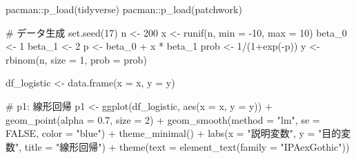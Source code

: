 \documentclass[
  a4paper,
]{ltjsbook}
\newenvironment{Shaded}{\begin{snugshade}}{\end{snugshade}}
\newcommand{\AttributeTok}[1]{\textcolor[rgb]{0.40,0.45,0.13}{#1}}
\newcommand{\CommentTok}[1]{\textcolor[rgb]{0.37,0.37,0.37}{#1}}
\newcommand{\ConstantTok}[1]{\textcolor[rgb]{0.56,0.35,0.01}{#1}}
\newcommand{\DecValTok}[1]{\textcolor[rgb]{0.68,0.00,0.00}{#1}}
\newcommand{\FloatTok}[1]{\textcolor[rgb]{0.68,0.00,0.00}{#1}}
\newcommand{\FunctionTok}[1]{\textcolor[rgb]{0.28,0.35,0.67}{#1}}
\newcommand{\NormalTok}[1]{\textcolor[rgb]{0.00,0.23,0.31}{#1}}
\newcommand{\OtherTok}[1]{\textcolor[rgb]{0.00,0.23,0.31}{#1}}
\newcommand{\SpecialCharTok}[1]{\textcolor[rgb]{0.37,0.37,0.37}{#1}}
\newcommand{\StringTok}[1]{\textcolor[rgb]{0.13,0.47,0.30}{#1}}
\begin{document}
\begin{Shaded}
\begin{Highlighting}[]
\NormalTok{pacman}\SpecialCharTok{::}\FunctionTok{p\_load}\NormalTok{(tidyverse)}
\NormalTok{pacman}\SpecialCharTok{::}\FunctionTok{p\_load}\NormalTok{(patchwork)}

\CommentTok{\# データ生成}
\FunctionTok{set.seed}\NormalTok{(}\DecValTok{17}\NormalTok{)}
\NormalTok{n }\OtherTok{\textless{}{-}} \DecValTok{200}
\NormalTok{x }\OtherTok{\textless{}{-}} \FunctionTok{runif}\NormalTok{(n, }\AttributeTok{min =} \SpecialCharTok{{-}}\DecValTok{10}\NormalTok{, }\AttributeTok{max =} \DecValTok{10}\NormalTok{)}
\NormalTok{beta\_0 }\OtherTok{\textless{}{-}} \DecValTok{1}
\NormalTok{beta\_1 }\OtherTok{\textless{}{-}} \DecValTok{2}
\NormalTok{p }\OtherTok{\textless{}{-}}\NormalTok{ beta\_0 }\SpecialCharTok{+}\NormalTok{ x }\SpecialCharTok{*}\NormalTok{ beta\_1}
\NormalTok{prob }\OtherTok{\textless{}{-}} \DecValTok{1}\SpecialCharTok{/}\NormalTok{(}\DecValTok{1}\SpecialCharTok{+}\FunctionTok{exp}\NormalTok{(}\SpecialCharTok{{-}}\NormalTok{p))}
\NormalTok{y }\OtherTok{\textless{}{-}} \FunctionTok{rbinom}\NormalTok{(n, }\AttributeTok{size =} \DecValTok{1}\NormalTok{, }\AttributeTok{prob =}\NormalTok{ prob)}

\NormalTok{df\_logistic }\OtherTok{\textless{}{-}} \FunctionTok{data.frame}\NormalTok{(}\AttributeTok{x =}\NormalTok{ x, }\AttributeTok{y =}\NormalTok{ y)}

\CommentTok{\# p1: 線形回帰}
\NormalTok{p1 }\OtherTok{\textless{}{-}} \FunctionTok{ggplot}\NormalTok{(df\_logistic, }\FunctionTok{aes}\NormalTok{(}\AttributeTok{x =}\NormalTok{ x, }\AttributeTok{y =}\NormalTok{ y)) }\SpecialCharTok{+}
    \FunctionTok{geom\_point}\NormalTok{(}\AttributeTok{alpha =} \FloatTok{0.7}\NormalTok{, }\AttributeTok{size =} \DecValTok{2}\NormalTok{) }\SpecialCharTok{+}
    \FunctionTok{geom\_smooth}\NormalTok{(}\AttributeTok{method =} \StringTok{"lm"}\NormalTok{, }\AttributeTok{se =} \ConstantTok{FALSE}\NormalTok{, }\AttributeTok{color =} \StringTok{"blue"}\NormalTok{) }\SpecialCharTok{+}
    \FunctionTok{theme\_minimal}\NormalTok{() }\SpecialCharTok{+}
    \FunctionTok{labs}\NormalTok{(}\AttributeTok{x =} \StringTok{"説明変数"}\NormalTok{, }\AttributeTok{y =} \StringTok{"目的変数"}\NormalTok{, }\AttributeTok{title =} \StringTok{"線形回帰"}\NormalTok{) }\SpecialCharTok{+}
    \FunctionTok{theme}\NormalTok{(}\AttributeTok{text =} \FunctionTok{element\_text}\NormalTok{(}\AttributeTok{family =} \StringTok{"IPAexGothic"}\NormalTok{))}


\end{Highlighting}
\end{Shaded}
\end{document}
